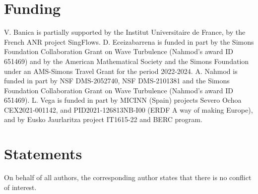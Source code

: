 \documentclass[11pt,reqno]{amsart}
\theoremstyle{definition}
\begin{document}
\section*{Funding}
V. Banica is partially supported by the Institut Universitaire de France, by the French ANR project SingFlows. 
D. Eceizabarrena is funded in part by the 
Simons Foundation Collaboration Grant on Wave Turbulence (Nahmod’s award
ID 651469) and by the American Mathematical Society and the Simons Foundation under an AMS-Simons Travel Grant for the period 2022-2024. 
A. Nahmod is funded in part by NSF DMS-2052740, NSF DMS-2101381
and the Simons Foundation Collaboration Grant on Wave Turbulence (Nahmod’s award
ID 651469).
L. Vega is funded in part by MICINN (Spain) projects Severo Ochoa CEX2021-001142, and PID2021-126813NB-I00 (ERDF A way of making Europe), and by Eusko Jaurlaritza project IT1615-22 and BERC program. 



\section*{Statements}
On behalf of all authors, the corresponding author states that there is no conflict of interest.
\end{document}
